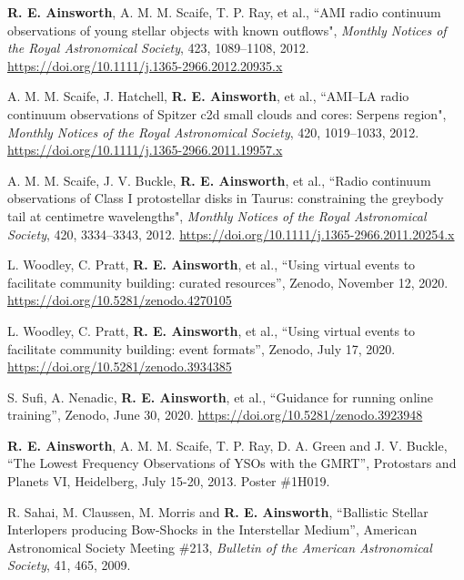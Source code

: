 \begin{cvpubs}
{\begin{cvetar}
        \item {\textbf{R. E. Ainsworth}, A. M. M. Scaife, T. P. Ray, et al., ``AMI radio continuum observations of young stellar objects with known outflows", \textit{Monthly Notices of the Royal Astronomical Society}, 423, 1089--1108, 2012. \url{https://doi.org/10.1111/j.1365-2966.2012.20935.x}}
        \item {A. M. M. Scaife, J. Hatchell, \textbf{R. E. Ainsworth}, et al., ``AMI--LA radio continuum observations of Spitzer c2d small clouds and cores: Serpens region", \textit{Monthly Notices of the Royal Astronomical Society}, 420, 1019--1033, 2012. \url{https://doi.org/10.1111/j.1365-2966.2011.19957.x}}
        \item {A. M. M. Scaife, J. V. Buckle, \textbf{R. E. Ainsworth}, et al., ``Radio continuum observations of Class I protostellar disks in Taurus: constraining the greybody tail at centimetre wavelengths", \textit{Monthly Notices of the Royal Astronomical Society}, 420, 3334--3343, 2012. \url{https://doi.org/10.1111/j.1365-2966.2011.20254.x}}
      \end{cvetar}
    }
\end{cvpubs}

\begin{cvpubs}
  \cvpub
    {
      \begin{cvetar}
        \item {L. Woodley, C. Pratt, \textbf{R. E. Ainsworth}, et al., ``Using virtual events to facilitate community building: curated resources'', Zenodo, November 12, 2020. \url{https://doi.org/10.5281/zenodo.4270105}}
        \item {L. Woodley, C. Pratt, \textbf{R. E. Ainsworth}, et al., ``Using virtual events to facilitate community building: event formats'', Zenodo, July 17, 2020. \url{https://doi.org/10.5281/zenodo.3934385}}
        \item {S. Sufi, A. Nenadic, \textbf{R. E. Ainsworth}, et al., ``Guidance for running online training'', Zenodo, June 30, 2020. \url{https://doi.org/10.5281/zenodo.3923948}}
        \item {\textbf{R. E. Ainsworth}, A. M. M. Scaife, T. P. Ray, D. A. Green and J. V. Buckle, ``The Lowest Frequency Observations of YSOs with the GMRT'', Protostars and Planets VI, Heidelberg, July 15-20, 2013. Poster \#1H019.}
        \item {R. Sahai, M. Claussen, M. Morris and \textbf{R. E. Ainsworth}, ``Ballistic Stellar Interlopers producing Bow-Shocks in the Interstellar Medium'', American Astronomical Society Meeting \#213, \textit{Bulletin of the American Astronomical Society}, 41, 465, 2009.}
      \end{cvetar}
    }
\end{cvpubs}

